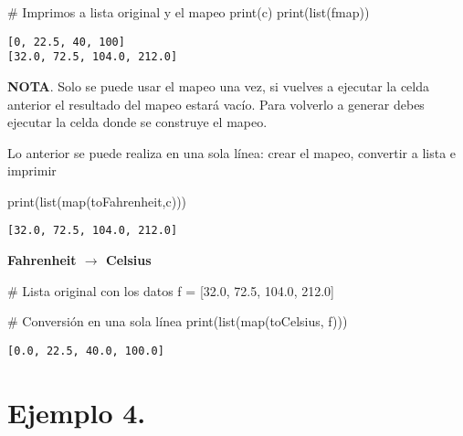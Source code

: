 \documentclass[
  letterpaper,
  DIV=11,
  numbers=noendperiod]{scrreprt}
\newenvironment{Shaded}{\begin{snugshade}}{\end{snugshade}}
\newcommand{\BuiltInTok}[1]{\textcolor[rgb]{0.00,0.23,0.31}{#1}}
\newcommand{\CommentTok}[1]{\textcolor[rgb]{0.37,0.37,0.37}{#1}}
\newcommand{\FloatTok}[1]{\textcolor[rgb]{0.68,0.00,0.00}{#1}}
\newcommand{\NormalTok}[1]{\textcolor[rgb]{0.00,0.23,0.31}{#1}}
\newcommand{\OperatorTok}[1]{\textcolor[rgb]{0.37,0.37,0.37}{#1}}
\begin{document}
\begin{Shaded}
\begin{Highlighting}[]
\CommentTok{\# Imprimos a lista original y el mapeo}
\BuiltInTok{print}\NormalTok{(c)}
\BuiltInTok{print}\NormalTok{(}\BuiltInTok{list}\NormalTok{(fmap))}
\end{Highlighting}
\end{Shaded}

\begin{verbatim}
[0, 22.5, 40, 100]
[32.0, 72.5, 104.0, 212.0]
\end{verbatim}

\textbf{NOTA}. Solo se puede usar el mapeo una vez, si vuelves a
ejecutar la celda anterior el resultado del mapeo estará vacío. Para
volverlo a generar debes ejecutar la celda donde se construye el mapeo.

Lo anterior se puede realiza en una sola línea: crear el mapeo,
convertir a lista e imprimir

\begin{Shaded}
\begin{Highlighting}[]
\BuiltInTok{print}\NormalTok{(}\BuiltInTok{list}\NormalTok{(}\BuiltInTok{map}\NormalTok{(toFahrenheit,c)))}
\end{Highlighting}
\end{Shaded}

\begin{verbatim}
[32.0, 72.5, 104.0, 212.0]
\end{verbatim}

\textbf{Fahrenheit \(\to\) Celsius}

\begin{Shaded}
\begin{Highlighting}[]
\CommentTok{\# Lista original con los datos}
\NormalTok{f }\OperatorTok{=}\NormalTok{ [}\FloatTok{32.0}\NormalTok{, }\FloatTok{72.5}\NormalTok{, }\FloatTok{104.0}\NormalTok{, }\FloatTok{212.0}\NormalTok{]}

\CommentTok{\# Conversión en una sola línea}
\BuiltInTok{print}\NormalTok{(}\BuiltInTok{list}\NormalTok{(}\BuiltInTok{map}\NormalTok{(toCelsius, f)))}
\end{Highlighting}
\end{Shaded}

\begin{verbatim}
[0.0, 22.5, 40.0, 100.0]
\end{verbatim}

\section{\texorpdfstring{\textbf{Ejemplo
4.}}{Ejemplo 4.}}\label{ejemplo-4.-1}
\end{document}
